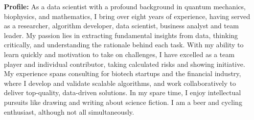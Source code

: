 
\vspace*{-3mm}
\begin{tcolorbox}[
        width=\textwidth,
        colback={gray!30},
        colframe=white,
        sharp corners,
        boxrule=0mm,
        arc=1mm,
    ]
    \begin{spacing}{1.2}
        \begin{multicols}{2}
            {\bf\large Profile:}
            As a data scientist with a profound background in quantum mechanics, biophysics, and mathematics, I bring over eight years of experience, having served as a researcher, algorithm developer, data scientist, business analyst and team leader. My passion lies in extracting fundamental insights from data, thinking critically, and understanding the rationale behind each task. With my ability to learn quickly and motivation to take on challenges, I have excelled as a team player and individual contributor, taking calculated risks and showing initiative. My experience spans consulting for biotech startups and the financial industry, where I develop and validate scalable algorithms, and work collaboratively to deliver top-quality, data-driven solutions. In my spare time, I enjoy intellectual pursuits like drawing and writing about science fiction. I am a beer and cycling enthusiast, although not all simultaneously.

        \end{multicols}
    \end{spacing}
    \vspace*{-4mm}

\end{tcolorbox}
\vspace*{-8mm}